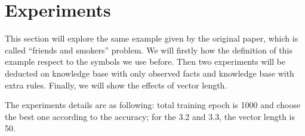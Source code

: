
\section{Experiments}

This section will explore the same example given by the original paper, which is called ``friends and smokers'' problem. We will firstly how the definition of this example respect to the symbols we use before. Then two experiments will be deducted on knowledge base with only observed facts and knowledge base with extra rules. Finally, we will show the effects of vector length.

The experiments details are as following: total training epoch is 1000 and choose the best one according to the accuracy; for the 3.2 and 3.3, the vector length is 50. 








